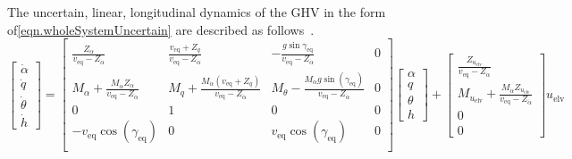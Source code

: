 The uncertain, linear, longitudinal dynamics of the GHV in the form of\eqref{eqn.wholeSystemUncertain} are described as follows\ \cite{stengel.flightdynamics.2004}.
\begin{equation*}
  \begin{bmatrix}
    \dot{\alpha} \\
    \dot{q} \\
    \dot{\theta} \\
    \dot{h}
  \end{bmatrix}=
  \begin{bmatrix}
    \frac{Z_{\alpha}}{v_{\text{eq}}-Z_{\dot{\alpha}}} & \frac{v_{\text{eq}}+Z_{q}}{v_{\text{eq}}-Z_{\dot{\alpha}}} & -\frac{g\sin{\gamma_{\text{eq}}}}{v_{\text{eq}}-Z_{\dot{\alpha}}} & 0 \\
    M_{\alpha}+\frac{M_{\dot{\alpha}}Z_{\alpha}}{v_{\text{eq}}-Z_{\dot{\alpha}}} & M_{q}+\frac{M_{\dot{\alpha}}(v_{\text{eq}}+Z_{q})}{v_{\text{eq}}-Z_{\dot{\alpha}}} & M_{\theta}-\frac{M_{\dot{\alpha}}g\sin(\gamma_{\text{eq}})}{v_{\text{eq}}-Z_{\dot{\alpha}}} & 0 \\
    0 & 1 & 0 & 0 \\
    -v_{\text{eq}}\cos(\gamma_{\text{eq}}) & 0 & v_{\text{eq}}\cos(\gamma_{\text{eq}}) & 0 \\
  \end{bmatrix}
  \begin{bmatrix}
    \alpha \\
    q \\
    \theta \\
    h
  \end{bmatrix}+
  \begin{bmatrix}
    \frac{Z_{u_{\text{elv}}}}{v_{\text{eq}}-Z_{\dot{\alpha}}} \\
    M_{u_{\text{elv}}}+\frac{M_{\dot{\alpha}}Z_{u_{\text{elv}}}}{v_{\text{eq}}-Z_{\dot{\alpha}}} \\
    0 \\
    0
  \end{bmatrix}
  u_{\text{elv}}
\end{equation*}

